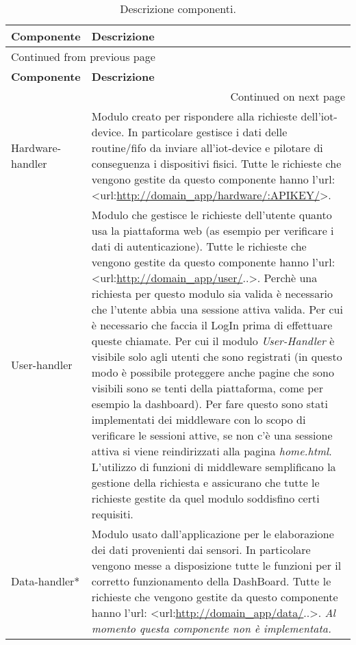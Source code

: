 \documentclass[onecolumn,a4paper]{article}
\begin{document}
\begin{longtable}{|l|p{8.7cm}|}
\caption{Descrizione componenti.}
\\
\cellcolor{grey!15} \textbf{Componente} & \cellcolor{grey!15} \textbf{Descrizione}\\
\hline
\endfirsthead
\multicolumn{2}{l}{Continued from previous page} \\
\hline

\cellcolor{grey!15} \textbf{Componente} & \cellcolor{grey!15} \textbf{Descrizione} \\

\hline
\endhead
\hline\multicolumn{2}{r}{Continued on next page} \\
\endfoot
\endlastfoot
\hline
Hardware-handler & Modulo creato per rispondere alla richieste dell'iot-device. In particolare gestisce i dati delle routine/fifo da inviare all'iot-device e pilotare di conseguenza i dispositivi fisici. Tutte le richieste che vengono gestite da questo componente hanno l'url: <url:\url{http://domain\_app/hardware/:APIKEY/}>.\\
\hline
User-handler & Modulo che gestisce le richieste dell'utente quanto usa la piattaforma web (as esempio per verificare i dati di autenticazione). Tutte le richieste che vengono gestite da questo componente hanno l'url: <url:\url{http://domain\_app/user/}..>. Perchè una richiesta per questo modulo sia valida è necessario che l'utente abbia una sessione attiva valida. Per cui è necessario che faccia il LogIn prima di effettuare queste chiamate. Per cui il modulo \emph{User-Handler} è visibile solo agli utenti che sono registrati (in questo modo è possibile proteggere anche pagine che sono visibili sono se tenti della piattaforma, come per esempio la dashboard). Per fare questo sono stati implementati dei middleware con lo scopo di verificare le sessioni attive, se non c'è una sessione attiva si viene reindirizzati alla pagina \emph{home.html}. L'utilizzo di funzioni di middleware semplificano la gestione della richiesta e assicurano che tutte le richieste gestite da quel modulo soddisfino certi requisiti.\\
\hline
Data-handler* & Modulo usato dall'applicazione per le elaborazione dei dati provenienti dai sensori. In particolare vengono messe a disposizione tutte le funzioni per il corretto funzionamento della DashBoard. Tutte le richieste che vengono gestite da questo componente hanno l'url: <url:\url{http://domain\_app/data/}..>. \emph{Al momento questa componente non è implementata.}\\

\end{longtable}
\end{document}

